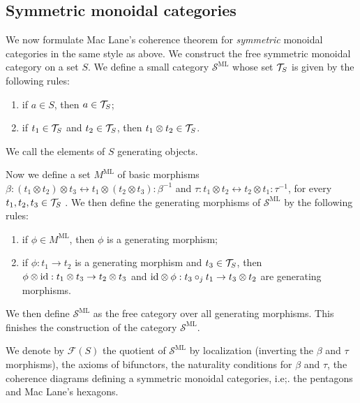 


\subsection{Symmetric monoidal categories} 

We now formulate Mac Lane's coherence theorem for \emph{symmetric} monoidal categories in the same style as above. We construct the free symmetric monoidal category on a set $S$.
We define a small category $\mathcal{S}^{\mathrm{ML}}$ whose set ${\cal T}_S$  is  given by the following rules:
\begin{enumerate}
    \item if $a \in S$, then $a\in{\cal T}_S$;
    \item if $t_1 \in {\cal T}_S$ and $t_2 \in {\cal T}_S$, then $t_1 \otimes t_2\in{\cal T}_S$.
\end{enumerate}
We call the elements of $S$ generating objects.

Now we define a set $M^{\mathrm{ML}}$ of basic morphisms $\beta: (t_1 \otimes t_2) \otimes t_3 \leftrightarrow t_1 \otimes (t_2\otimes t_3) : \beta^{-1}$  and $\tau: t_1\otimes t_2 \leftrightarrow t_2 \otimes t_1 : \tau^{-1}$,  for every $t_1,t_2,t_3  \in {\cal T}_S$
.
We then define the generating morphisms of  $\mathcal{S}^{\mathrm{ML}}$ by the following rules:
\begin{enumerate}
    \item if $\phi \in M^{\mathrm{ML}}$, then $\phi$ is a generating morphism; 
    \item if $\phi : t_1 \to t_2$ is a generating morphism and $t_3 \in {\cal T}_S$, then $\phi \otimes \mathrm{id} : t_1 \otimes t_3 \to t_2 \otimes t_3$ and $\mathrm{id} \otimes \phi : t_3 \circ_j t_1 \to t_3 \otimes t_2$ are generating morphisms.
\end{enumerate}
We then define $\mathcal{S}^{\mathrm{ML}}$ as the free category over all generating morphisms. 
This finishes the construction of the category $\mathcal{S}^{\mathrm{ML}}$.

\begin{definition}
    We denote  by $\mathcal{F}(S)$ the quotient of $\mathcal{S}^{\mathrm{ML}}$ by localization (inverting the $\beta$ and $\tau$ morphisms), the axioms of bifunctors, the naturality conditions for $\beta$ and $\tau$, the coherence diagrams defining a  symmetric monoidal categories, i.e;. the pentagons and Mac Lane's hexagons.
    \end{definition}

